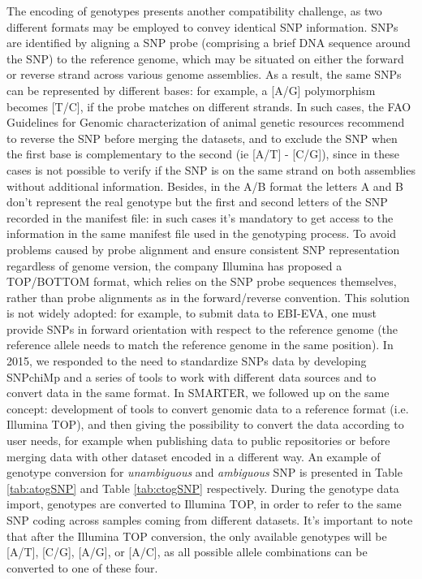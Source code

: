 \documentclass[a4paper,num-refs,gigabyte]{oup-contemporary}
\begin{document}
The encoding of genotypes presents another compatibility challenge, as two different formats may be employed to convey identical SNP information. SNPs are identified by aligning a SNP probe (comprising a brief DNA sequence around the SNP) to the reference genome, which may be situated on either the forward or reverse strand across various genome assemblies. As a result, the same SNPs can be represented by different bases: for example, a [A/G] polymorphism becomes [T/C], if the probe matches on different strands. In such cases, the FAO Guidelines for Genomic characterization of animal genetic resources\citep{Ajmone23} recommend to reverse the SNP before merging the datasets, and to exclude the SNP when the first base is complementary to the second (ie [A/T] - [C/G]), since in these cases is not possible to verify if the SNP is on the same strand on both assemblies without additional information.
Besides, in the A/B format the letters A and B don’t represent the real genotype but the first and second letters of the SNP recorded in the manifest file: in such cases it’s mandatory to get access to the information in the same manifest file used in the genotyping process.
To avoid problems caused by probe alignment and ensure consistent SNP representation regardless of genome version, the company Illumina has proposed a TOP/BOTTOM format\citep{IlluminaTOP}, which relies on the SNP probe sequences themselves, rather than probe alignments as in the forward/reverse convention. This solution is not widely adopted: for example, to submit data to EBI-EVA\citep{EVASubmit}, one must provide SNPs in forward orientation with respect to the reference genome (the reference allele needs to match the reference genome in the same position\citep{AssemblyChecker}).
In 2015, we responded to the need to standardize SNPs data\citep{Nicolazzi2015a} by developing SNPchiMp\citep{Nicolazzi2015b} and a series of tools to work with different data sources and to convert data in the same format\citep{Nicolazzi2016}. In SMARTER, we followed up on the same concept: development of tools to convert genomic data to a reference format (i.e. Illumina TOP), and then giving the possibility to convert the data according to user needs, for example when publishing data to public repositories or before merging data with other dataset encoded in a different way. An example of genotype conversion for \emph{unambiguous} and \emph{ambiguous} SNP is presented in Table \ref{tab:atogSNP} and Table \ref{tab:ctogSNP} respectively. During the genotype data import, genotypes are converted to Illumina TOP, in order to refer to the same SNP coding across samples coming from different datasets. It's important to note that after the Illumina TOP conversion, the only available genotypes will be [A/T], [C/G], [A/G], or [A/C], as all possible allele combinations can be converted to one of these four.
\end{document}
